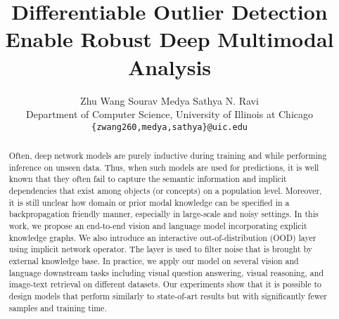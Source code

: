 \documentclass{article}
\begin{document}
\title{Differentiable Outlier Detection Enable Robust Deep Multimodal Analysis}





\author{Zhu Wang \qquad Sourav Medya \qquad Sathya N. Ravi\\
  Department of Computer Science, University of Illinois at Chicago\\
  \texttt{\{zwang260,medya,sathya\}@uic.edu} \\
}





\maketitle


\begin{abstract}
Often, deep network models are purely inductive during training and while performing inference on unseen data. Thus, when such models are used for predictions, it is well known that they often fail to capture the semantic information and implicit dependencies that exist among objects (or concepts) on a population level. Moreover, it is still unclear how domain or prior modal knowledge can be specified in a backpropagation friendly manner, especially in large-scale and noisy settings. In this work, we propose an end-to-end vision and language model incorporating explicit knowledge graphs. We also introduce an interactive out-of-distribution (OOD) layer using implicit network operator. The layer is used to filter noise that is brought by external knowledge base. In practice, we apply our model on several vision and language downstream tasks including visual question answering, visual reasoning, and image-text retrieval on different datasets. Our experiments show that it is possible to design models that perform similarly to state-of-art results but with significantly fewer samples and training time.






\end{abstract}
\end{document}
